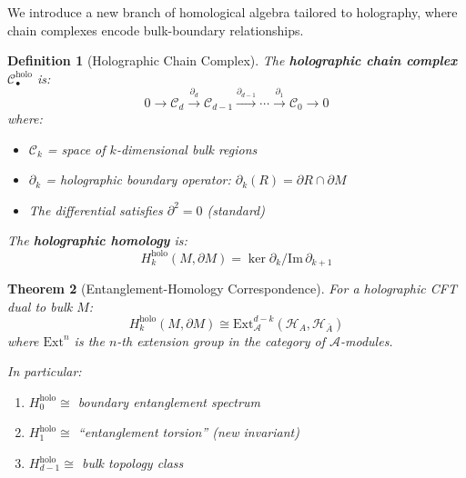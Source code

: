 \documentclass[12pt,a4paper]{article}
\newtheorem{theorem}{Theorem}[section]
\newtheorem{definition}[theorem]{Definition}
\begin{document}
We introduce a new branch of homological algebra tailored to holography, where chain complexes encode bulk-boundary relationships.

\begin{definition}[Holographic Chain Complex]\label{def:holo-chain}
The \textbf{holographic chain complex} $\mathcal{C}_\bullet^{\text{holo}}$ is:
\begin{equation}
0 \to \mathcal{C}_d \xrightarrow{\partial_d} \mathcal{C}_{d-1} \xrightarrow{\partial_{d-1}} \cdots \xrightarrow{\partial_1} \mathcal{C}_0 \to 0
\end{equation}
where:
\begin{itemize}
    \item $\mathcal{C}_k$ = space of $k$-dimensional bulk regions
    \item $\partial_k$ = holographic boundary operator: $\partial_k(R) = \partial R \cap \partial M$
    \item The differential satisfies $\partial^2 = 0$ (standard)
\end{itemize}

The \textbf{holographic homology} is:
\begin{equation}
H_k^{\text{holo}}(M, \partial M) = \ker \partial_k / \text{Im} \, \partial_{k+1}
\end{equation}
\end{definition}

\begin{theorem}[Entanglement-Homology Correspondence]\label{thm:ent-homology}
For a holographic CFT dual to bulk $M$:
\begin{equation}
H_k^{\text{holo}}(M, \partial M) \cong \text{Ext}^{d-k}_{\mathcal{A}}(\mathcal{H}_A, \mathcal{H}_{\bar{A}})
\end{equation}
where $\text{Ext}^n$ is the $n$-th extension group in the category of $\mathcal{A}$-modules.

In particular:
\begin{enumerate}
    \item $H_0^{\text{holo}} \cong$ boundary entanglement spectrum
    \item $H_1^{\text{holo}} \cong$ ``entanglement torsion'' (new invariant)
    \item $H_{d-1}^{\text{holo}} \cong$ bulk topology class
\end{enumerate}
\end{theorem}
\end{document}
